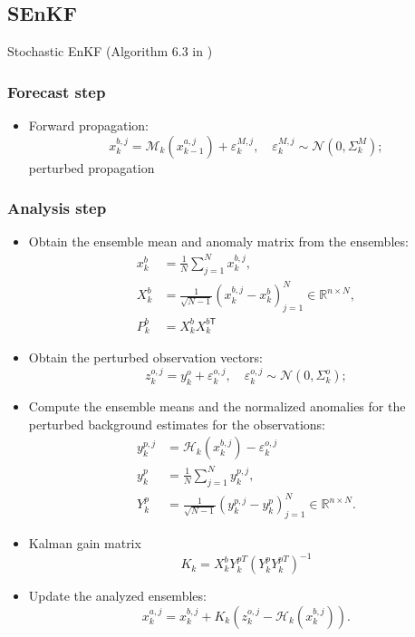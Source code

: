 \documentclass{article}
\newcommand{\trans}{\mathsf{T}}
\begin{document}
\subsection{SEnKF}
Stochastic EnKF (Algorithm 6.3 in \cite{Bocquet2016})
\subsubsection{Forecast step}
\begin{itemize}
	\item Forward propagation:
	      $$
		      x_k^{b,j}=\mathcal{M}_k(x_{k-1}^{a,j})+\varepsilon_k^{M,j},\quad \varepsilon_k^{M,j}\sim\mathcal{N}(0,\Sigma_k^M);
	      $$
	      perturbed propagation
\end{itemize}


\subsubsection{Analysis step}
\begin{itemize}
	\item Obtain the ensemble mean and anomaly matrix from the ensembles:
	      \begin{align*}
		      x_k^b & = \frac1N\sum_{j=1}^Nx_k^{b,j},                                           \\
		      X_k^b & = \frac1{\sqrt{N-1}}(x_k^{b,j} - x_k^b)_{j=1}^N\in\mathbb{R}^{n\times N}, \\
		      P_k^b & = X_k^bX_k^{b\trans}
	      \end{align*}
	\item Obtain the perturbed observation vectors:
	      $$
		      z_k^{o,j} = y_k^o + \varepsilon_k^{o,j},\quad\varepsilon_k^{o,j}\sim\mathcal{N}(0,\Sigma_k^o);
	      $$
	\item Compute the ensemble means and the normalized anomalies for the perturbed background estimates for the observations:
	      \begin{align*}
		      y_k^{p,j} & = \mathcal{H}_k(x_k^{b,j}) - \varepsilon_k^{o,j}                          \\
		      y_k^p     & = \frac1N\sum_{j=1}^Ny_k^{p,j},                                           \\
		      Y_k^p     & = \frac1{\sqrt{N-1}}(y_k^{p,j} - y_k^p)_{j=1}^N\in\mathbb{R}^{n\times N}.
	      \end{align*}
	\item Kalman gain matrix
	      $$
		      K_k=X_k^bY_k^{pT}(Y_k^pY_k^{pT})^{-1}
	      $$
	\item Update the analyzed ensembles:
	      $$
		      x_k^{a,j}=x_k^{b,j}+K_k(z_k^{o,j}-\mathcal{H}_k(x_k^{b,j})).
	      $$
\end{itemize}
\end{document}
